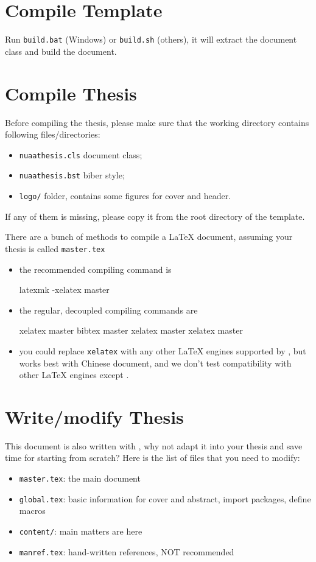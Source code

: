 \section{Compile Template}

Run \verb|build.bat| (Windows) or \verb|build.sh| (others),
it will extract the document class and build the document.

\section{Compile Thesis}

Before compiling the thesis,
please make sure that the working directory contains following files/directories:
\begin{itemize}
  \item \verb|nuaathesis.cls| document class;
  \item \verb|nuaathesis.bst| biber style;
  \item \verb|logo/| folder, contains some figures for cover and header.
\end{itemize}
If any of them is missing, please copy it from the root directory of the template.

There are a bunch of methods to compile a \LaTeX{} document,
assuming your thesis is called \verb|master.tex|
\begin{itemize}
\item
the recommended compiling command is
\begin{shell}
latexmk -xelatex master
\end{shell}
\item the regular, decoupled compiling commands are
\begin{shell}
xelatex master
bibtex master
xelatex master
xelatex master
\end{shell}
\item you could replace \verb|xelatex| with any other \LaTeX{} engines supported by \CTeX,
but \XeLaTeX{} works best with Chinese document,
and we don't test compatibility with other \LaTeX{} engines except \XeLaTeX.
\end{itemize}

\section{Write/modify Thesis}

This document is also written with \nuaathesis,
why not adapt it into your thesis and save time for starting from scratch?
Here is the list of files that you need to modify:
\begin{itemize}
  \item \verb|master.tex|: the main document
  \item \verb|global.tex|: basic information for cover and abstract, import packages, define macros
  \item \verb|content/|: main matters are here
  \item \verb|manref.tex|: hand-written references, NOT recommended
\end{itemize}
